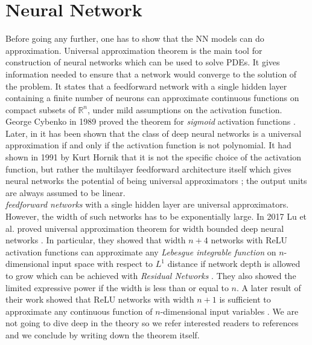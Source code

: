 \section{Neural Network}\label{sec:neural_network}
Before going any further, one has to show that the NN models can do approximation. Universal approximation theorem is the main tool for construction of neural networks which can be used to solve PDEs. It gives information needed to ensure that a network would converge to the solution of the problem. It states that a feedforward network with a single hidden layer containing a finite number of neurons can approximate continuous functions on compact subsets of $\mathbb{R}^n$, under mild assumptions on the activation function. George Cybenko in 1989 proved the theorem for \textit{sigmoid} activation functions \cite{cybenko1989approximation}. Later, in \cite{li1999alpha} it has been shown that the class of deep neural networks is a universal approximation if and only if the activation function is not polynomial. It had shown in 1991 by Kurt Hornik  that it is not the specific choice of the activation function, but rather the multilayer feedforward architecture itself which gives neural networks the potential of being universal approximators \cite{hofbauer1990adaptive}; the output units are always assumed to be linear.\\
\textit{feedforward networks} with a single hidden layer are universal approximators. However, the width of such networks has to be exponentially large. In 2017 Lu et al. proved universal approximation theorem for width bounded deep neural networks \cite{lu2017expressive}. In particular, they showed that width $n+4$ networks with ReLU activation functions can approximate any \textit{Lebesgue integrable function} on $n$-dimensional input space with respect to $L^{1}$ distance if network depth is allowed to grow which can be achieved with \textit{Residual Networks} \cite{he2016deep, lin2018resnet}. They also showed the limited expressive power if the width is less than or equal to $n$. A later result of their work showed that ReLU networks with width $n+1$ is sufficient to approximate any continuous function of $n$-dimensional input variables \cite{hanin2017approximating}. We are not going to dive deep in the theory so we refer interested readers to \cite{tikk2003survey, kratsios2019universal} references and we conclude by writing down the theorem itself.
